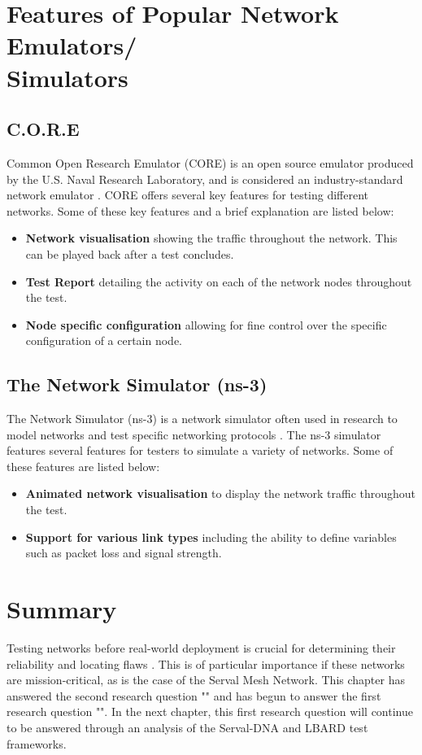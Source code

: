 \section{Features of Popular Network Emulators/\\Simulators}
\subsection{C.O.R.E}
Common Open Research Emulator (CORE) is an open source emulator produced by the U.S. Naval Research Laboratory, and is considered an industry-standard network emulator \parencite{coreDocumentation}.
CORE offers several key features for testing different networks. Some of these key features and a brief explanation are listed below:
\begin{itemize}
    \item \textbf{Network visualisation} showing the traffic throughout the network. This can be played back after a test concludes.
    \item \textbf{Test Report} detailing the activity on each of the network nodes throughout the test.
    \item \textbf{Node specific configuration} allowing for fine control over the specific configuration of a certain node.
\end{itemize}

\subsection{The Network Simulator (ns-3)}
The Network Simulator (ns-3) is a network simulator often used in research to model networks and test specific networking protocols \parencite{modellingAndTools2010}.
The ns-3 simulator features several features for testers to simulate a variety of networks. Some of these features are listed below:
\begin{itemize}
    \item \textbf{Animated network visualisation} to display the network traffic throughout the test.
    \item \textbf{Support for various link types} including the ability to define variables such as packet loss and signal strength.
\end{itemize}


\section{Summary}
Testing networks before real-world deployment is crucial for determining their reliability and locating flaws \parencite{predeploymentTesting2006}.
This is of particular importance if these networks are mission-critical, as is the case of the Serval Mesh Network.
This chapter has answered the second research question "\secondRQ" and has begun to answer the first research question "\firstRQ".
In the next chapter, this first research question will continue to be answered through an analysis of the Serval-DNA and LBARD test frameworks.
